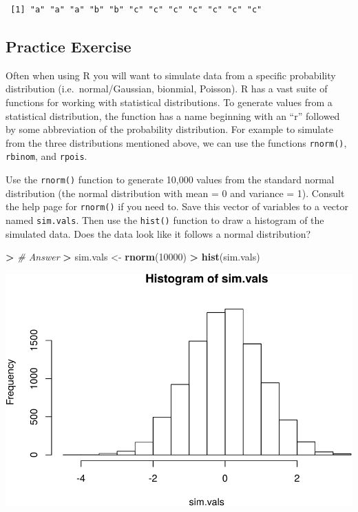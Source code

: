 \documentclass[]{krantz}
\makeatletter
\newenvironment{Shaded}{\begin{snugshade}}{\end{snugshade}}
\newcommand{\CommentTok}[1]{\textcolor[rgb]{0.37,0.37,0.37}{\textit{#1}}}
\newcommand{\DecValTok}[1]{\textcolor[rgb]{0.06,0.06,0.06}{#1}}
\newcommand{\ErrorTok}[1]{\textcolor[rgb]{0.14,0.14,0.14}{\textbf{#1}}}
\newcommand{\KeywordTok}[1]{\textcolor[rgb]{0.27,0.27,0.27}{\textbf{#1}}}
\newcommand{\NormalTok}[1]{#1}
\newcommand{\OperatorTok}[1]{\textcolor[rgb]{0.43,0.43,0.43}{\textbf{#1}}}
\newcommand{\StringTok}[1]{\textcolor[rgb]{0.5,0.5,0.5}{#1}}
\newenvironment{kframe}{%
\medskip{}
\setlength{\fboxsep}{.8em}
 \def\at@end@of@kframe{}%
 \ifinner\ifhmode%
  \def\at@end@of@kframe{\end{minipage}}%
  \begin{minipage}{\columnwidth}%
 \fi\fi%
 \def\FrameCommand##1{\hskip\@totalleftmargin \hskip-\fboxsep
 \colorbox{shadecolor}{##1}\hskip-\fboxsep
     \hskip-\linewidth \hskip-\@totalleftmargin \hskip\columnwidth}%
 \MakeFramed {\advance\hsize-\width
   \@totalleftmargin\z@ \linewidth\hsize
   \@setminipage}}%
 {\par\unskip\endMakeFramed%
 \at@end@of@kframe}
\renewenvironment{Shaded}{\begin{kframe}}{\end{kframe}}
\makeatother
\begin{document}
\begin{verbatim}
 [1] "a" "a" "a" "b" "b" "c" "c" "c" "c" "c" "c" "c"
\end{verbatim}

\hypertarget{practice-exercise-3}{%
\subsection{Practice Exercise}\label{practice-exercise-3}}

Often when using R you will want to simulate data from a specific probability distribution (i.e.~normal/Gaussian, bionmial, Poisson). R has a vast suite of functions for working with statistical distributions. To generate values from a statistical distribution, the function has a name beginning with an ``r'' followed by some abbreviation of the probability distribution. For example to simulate from the three distributions mentioned above, we can use the functions \texttt{rnorm()}, \texttt{rbinom}, and \texttt{rpois}.

Use the \texttt{rnorm()} function to generate 10,000 values from the standard normal distribution (the normal distribution with mean = 0 and variance = 1). Consult the help page for \texttt{rnorm()} if you need to. Save this vector of variables to a vector named \texttt{sim.vals}. Then use the \texttt{hist()} function to draw a histogram of the simulated data. Does the data look like it follows a normal distribution?

\begin{Shaded}
\begin{Highlighting}[]
\OperatorTok{>}\StringTok{ }\CommentTok{# Answer}
\ErrorTok{>}\StringTok{ }\NormalTok{sim.vals <-}\StringTok{ }\KeywordTok{rnorm}\NormalTok{(}\DecValTok{10000}\NormalTok{)}
\OperatorTok{>}\StringTok{ }\KeywordTok{hist}\NormalTok{(sim.vals)}
\end{Highlighting}
\end{Shaded}

\includegraphics{bookdown_files/figure-latex/unnamed-chunk-55-1.pdf}
\end{document}
